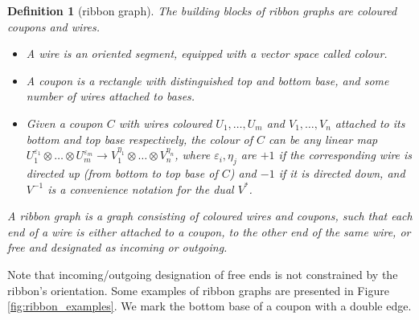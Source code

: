 \documentclass{amsart}
\newtheorem{definition}[conjecture]{Definition}
\begin{document}
\begin{definition}[ribbon graph]
The building blocks of ribbon graphs are coloured coupons and wires.
\begin{itemize}
\item A \emph{wire} is an oriented segment, equipped with a vector space called \emph{colour}.
\item A \emph{coupon} is a rectangle with distinguished top and bottom base, and some number of wires attached to bases.
\item Given a coupon $C$ with wires coloured $U_1,\dots,U_m$ and $V_1,\dots,V_n$ attached to its bottom and top base respectively, the \emph{colour} of $C$ can be any linear map $U_1^{\varepsilon_1}\otimes\dots\otimes U_m^{\varepsilon_m}\to V_1^{\eta_1}\otimes\dots\otimes V_n^{\eta_n}$, where $\varepsilon_i,\eta_j$ are $+1$ if the corresponding wire is directed up (from bottom to top base of $C$) and $-1$ if it is directed down, and $V^{-1}$ is a convenience notation for the dual $V^*$.
\end{itemize}
A \emph{ribbon graph} is a graph consisting of coloured wires and coupons, such that each end of a wire is either attached to a coupon, to the other end of the same wire, or free and designated as incoming or outgoing.
\end{definition}
Note that incoming/outgoing designation of free ends is not constrained by the ribbon's orientation. Some examples of ribbon graphs are presented in Figure \ref{fig:ribbon_examples}. We mark the bottom base of a coupon with a double edge.
\end{document}
